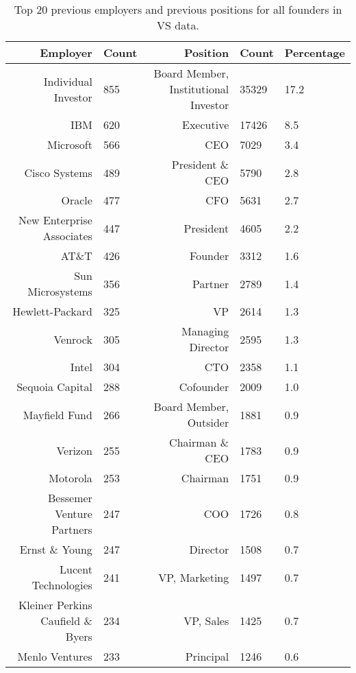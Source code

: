 \begin{table}[]
\centering
\begingroup\normalsize
\begin{tabular}{rlrll}
  \toprule
Employer & Count & Position & Count & Percentage \\ 
  \midrule
Individual Investor & 855 & Board Member, Institutional Investor & 35329 & 17.2 \\ 
  IBM & 620 & Executive & 17426 & 8.5 \\ 
  Microsoft & 566 & CEO & 7029 & 3.4 \\ 
  Cisco Systems & 489 & President \& CEO & 5790 & 2.8 \\ 
  Oracle & 477 & CFO & 5631 & 2.7 \\ 
  New Enterprise Associates & 447 & President & 4605 & 2.2 \\ 
  AT\&T & 426 & Founder & 3312 & 1.6 \\ 
  Sun Microsystems & 356 & Partner & 2789 & 1.4 \\ 
  Hewlett-Packard & 325 & VP & 2614 & 1.3 \\ 
  Venrock & 305 & Managing Director & 2595 & 1.3 \\ 
  Intel & 304 & CTO & 2358 & 1.1 \\ 
  Sequoia Capital & 288 & Cofounder & 2009 & 1.0 \\ 
  Mayfield Fund & 266 & Board Member, Outsider & 1881 & 0.9 \\ 
  Verizon & 255 & Chairman \& CEO & 1783 & 0.9 \\ 
  Motorola & 253 & Chairman & 1751 & 0.9 \\ 
  Bessemer Venture Partners & 247 & COO & 1726 & 0.8 \\ 
  Ernst \& Young & 247 & Director & 1508 & 0.7 \\ 
  Lucent Technologies & 241 & VP, Marketing & 1497 & 0.7 \\ 
  Kleiner Perkins Caufield \& Byers & 234 & VP, Sales & 1425 & 0.7 \\ 
  Menlo Ventures & 233 & Principal & 1246 & 0.6 \\ 
   \bottomrule
\end{tabular}
\endgroup
\caption{Top 20 previous employers and previous positions for all founders in VS data.} 
\label{table:VS_previousEmployersSummaryTable}
\end{table}
